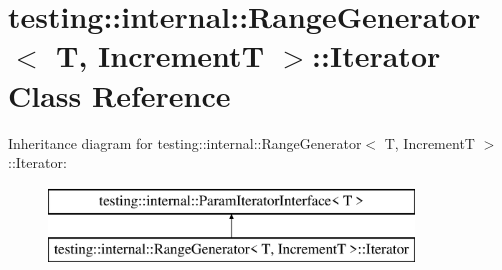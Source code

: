 \hypertarget{classtesting_1_1internal_1_1_range_generator_1_1_iterator}{}\section{testing\+:\+:internal\+:\+:Range\+Generator$<$ T, IncrementT $>$\+:\+:Iterator Class Reference}
\label{classtesting_1_1internal_1_1_range_generator_1_1_iterator}
Inheritance diagram for testing\+:\+:internal\+:\+:Range\+Generator$<$ T, IncrementT $>$\+:\+:Iterator\+:\begin{figure}[H]
\begin{center}
\leavevmode
\includegraphics[height=2.000000cm]{classtesting_1_1internal_1_1_range_generator_1_1_iterator}
\end{center}
\end{figure}
